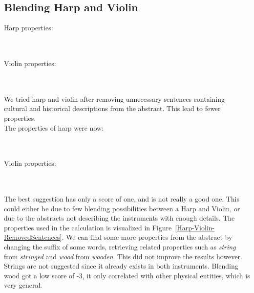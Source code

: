 \subsection{Blending Harp and Violin }

Harp properties:

\noindent{}
\\\\Violin properties:

\noindent{}
\\\\We tried harp and violin after removing unnecessary sentences containing cultural and historical descriptions from the abstract. This lead to fewer properties.
\\The properties of harp were now:

\noindent{}
\\\\Violin properties:

\noindent{}
\\\\The best suggestion has only a score of one, and is not really a good one. This could either be due to few blending possibilities between a Harp and Violin, or due to the abstracts not describing the instruments with enough details. The properties used in the calculation is visualized in Figure~\ref{Harp-Violin-RemovedSentences}.
We can find some more properties from the abstract by changing the suffix of some words, retrieving related properties such as \emph{string} from \emph{stringed} and \emph{wood} from \emph{wooden}. %
This did not improve the results however. Strings are not suggested since it already exists in both instruments. Blending wood got a low score of -3, it only correlated with other physical entities, which is very general.
		
